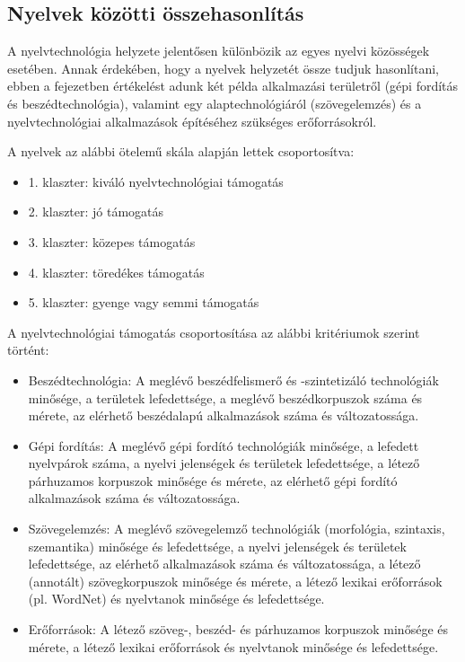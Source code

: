 \begin{multicols}{2}
  \subsection{Nyelvek közötti összehasonlítás}

  A nyelvtechnológia helyzete jelentősen különbözik az egyes nyelvi közösségek esetében. Annak érdekében, hogy a nyelvek helyzetét össze tudjuk hasonlítani, ebben a fejezetben értékelést adunk két példa alkalmazási területről (gépi fordítás és beszédtechnológia), valamint egy alaptechnológiáról (szövegelemzés) és a nyelvtechnológiai alkalmazások épí\-té\-sé\-hez szükséges erőforrásokról.

  A nyelvek az alábbi ötelemű skála alapján lettek csoportosítva:

  \begin{itemize}
  \item 1. klaszter: kiváló nyelvtechnológiai támogatás
  \item 2. klaszter: jó támogatás
  \item 3. klaszter: közepes támogatás
  \item 4. klaszter: töredékes támogatás
  \item 5. klaszter: gyenge vagy semmi támogatás
  \end{itemize}

  A nyelvtechnológiai támogatás csoportosítása az alábbi kritériumok szerint történt:


  \begin{itemize}
  \item Beszédtechnológia: A meglévő beszédfelismerő és -szintetizáló technológiák minősége, a területek lefedettsége, a meglévő beszédkorpuszok száma és mérete, az elérhető beszédalapú alkalmazások száma és változatossága.
  \item Gépi fordítás: A meglévő gépi fordító technológiák minősége, a lefedett nyelvpárok száma, a nyelvi jelenségek és területek lefedettsége, a létező párhuzamos korpuszok minősége és mérete, az elérhető gépi fordító alkalmazások száma és változatossága. 
  \item Szövegelemzés: A meglévő szövegelemző technológiák (morfológia, szintaxis, szemantika) minősége és lefedettsége, a nyelvi jelenségek és területek lefedettsége, az elérhető alkalmazások száma és változatossága, a létező (annotált) szövegkorpuszok minősége és mérete, a létező lexikai erőforrások (pl. WordNet) és nyelvtanok minősége és lefedettsége. 
  \item Erőforrások: A létező szöveg-, beszéd- és párhuzamos korpuszok minősége és mérete, a létező lexikai erőforrások és nyelvtanok minősége és lefedettsége.
  \end{itemize}


\end{multicols}
